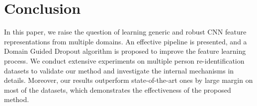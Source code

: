 




\section{Conclusion} %
\label{sec:conclusion}

In this paper, we raise the question of learning generic and robust CNN feature representations from multiple domains. An effective pipeline is presented, and a Domain Guided Dropout algorithm is proposed to improve the feature learning process. We conduct extensive experiments on multiple person re-identification datasets to validate our method and investigate the internal mechanisms in details. Moreover, our results outperform state-of-the-art ones by large margin on most of the datasets, which demonstrates the effectiveness of the proposed method.